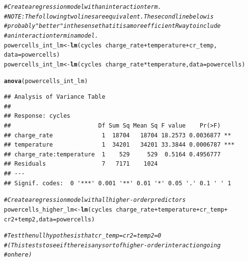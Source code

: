 \documentclass{article}\usepackage[]{graphicx}\usepackage[]{color}
\makeatletter
\newcommand{\hlcom}[1]{\textcolor[rgb]{0.678,0.584,0.686}{\textit{#1}}}%
\newcommand{\hlopt}[1]{\textcolor[rgb]{0,0,0}{#1}}%
\newcommand{\hlstd}[1]{\textcolor[rgb]{0.345,0.345,0.345}{#1}}%
\newcommand{\hlkwb}[1]{\textcolor[rgb]{0.69,0.353,0.396}{#1}}%
\newcommand{\hlkwc}[1]{\textcolor[rgb]{0.333,0.667,0.333}{#1}}%
\newcommand{\hlkwd}[1]{\textcolor[rgb]{0.737,0.353,0.396}{\textbf{#1}}}%
\newenvironment{kframe}{%
 \def\at@end@of@kframe{}%
 \ifinner\ifhmode%
  \def\at@end@of@kframe{\end{minipage}}%
  \begin{minipage}{\columnwidth}%
 \fi\fi%
 \def\FrameCommand##1{\hskip\@totalleftmargin \hskip-\fboxsep
 \colorbox{shadecolor}{##1}\hskip-\fboxsep
     \hskip-\linewidth \hskip-\@totalleftmargin \hskip\columnwidth}%
 \MakeFramed {\advance\hsize-\width
   \@totalleftmargin\z@ \linewidth\hsize
   \@setminipage}}%
 {\par\unskip\endMakeFramed%
 \at@end@of@kframe}
\newenvironment{knitrout}{}{} %
\makeatother
\begin{document}
\begin{knitrout}
\begin{kframe}
\begin{alltt}
\hlcom{# Create a regression model with an interaction term.}
\hlcom{# NOTE: The following two lines are equivalent. The second line below is}
\hlcom{# probably "better" in the sense that it is a more efficient R way to include}
\hlcom{# an interaction term in a model.}
\hlstd{powercells_int_lm} \hlkwb{<-} \hlkwd{lm}\hlstd{(cycles} \hlopt{~} \hlstd{charge_rate} \hlopt{+} \hlstd{temperature} \hlopt{+} \hlstd{cr_temp,}
                        \hlkwc{data} \hlstd{= powercells)}
\hlstd{powercells_int_lm} \hlkwb{<-} \hlkwd{lm}\hlstd{(cycles} \hlopt{~} \hlstd{charge_rate}\hlopt{*}\hlstd{temperature,} \hlkwc{data} \hlstd{= powercells)}

\hlkwd{anova}\hlstd{(powercells_int_lm)}
\end{alltt}
\begin{verbatim}
## Analysis of Variance Table
## 
## Response: cycles
##                         Df Sum Sq Mean Sq F value    Pr(>F)    
## charge_rate              1  18704   18704 18.2573 0.0036877 ** 
## temperature              1  34201   34201 33.3844 0.0006787 ***
## charge_rate:temperature  1    529     529  0.5164 0.4956777    
## Residuals                7   7171    1024                      
## ---
## Signif. codes:  0 '***' 0.001 '**' 0.01 '*' 0.05 '.' 0.1 ' ' 1
\end{verbatim}
\begin{alltt}
\hlcom{# Create a regression model with all higher-order predictors}
\hlstd{powercells_higher_lm} \hlkwb{<-} \hlkwd{lm}\hlstd{(cycles} \hlopt{~} \hlstd{charge_rate} \hlopt{+} \hlstd{temperature} \hlopt{+} \hlstd{cr_temp} \hlopt{+}
                             \hlstd{cr2} \hlopt{+} \hlstd{temp2,} \hlkwc{data} \hlstd{= powercells)}

\hlcom{# Test the null hypothesis that cr_temp = cr2 = temp2 = 0}
\hlcom{# (This tests to see if there is any sort of higher-order interaction going}
\hlcom{# on here)}


\end{alltt}
\end{kframe}
\end{knitrout}
\end{document}
